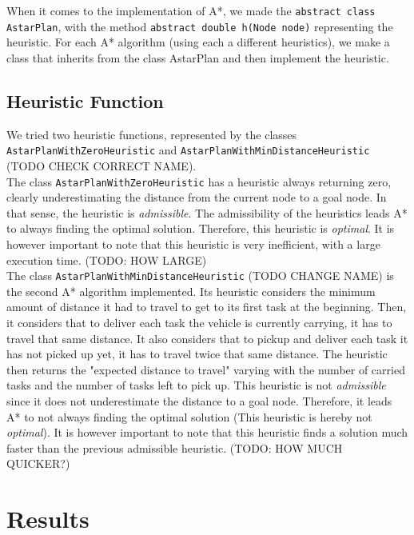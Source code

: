 \documentclass[11pt]{article}
\begin{document}
When it comes to the implementation of A*, we made the \texttt{abstract class AstarPlan}, with the method \texttt{abstract double h(Node node)} representing the heuristic. For each A* algorithm (using each a different heuristics), we make a class that inherits from\textsl{} the class AstarPlan and then implement the heuristic. 

\subsection{Heuristic Function}
We tried two heuristic functions, represented by the classes \texttt{AstarPlanWithZeroHeuristic} and \texttt{AstarPlanWithMinDistanceHeuristic} (TODO CHECK CORRECT NAME).\\

The class \texttt{AstarPlanWithZeroHeuristic} has a heuristic always returning zero, clearly underestimating the distance from the current node to a goal node. In that sense, the heuristic is \textit{admissible}. The admissibility of the heuristics leads A* to always finding the optimal solution. Therefore, this heuristic is \textit{optimal}. It is however important to note that this heuristic is very inefficient, with a large execution time. (TODO: HOW LARGE)\\

The class \texttt{AstarPlanWithMinDistanceHeuristic} (TODO CHANGE NAME) is the second A* algorithm implemented. Its heuristic considers the minimum amount of distance it had to travel to get to its first task at the beginning. Then, it considers that to deliver each task the vehicle is currently carrying, it has to travel that same distance. It also considers that to pickup and deliver each task it has not picked up yet, it has to travel twice that same distance. The heuristic then returns the "expected distance to travel" varying with the number of carried tasks and the number of tasks left to pick up. This heuristic is not \textit{admissible} since it does not underestimate the distance to a goal node. Therefore, it leads A* to not always finding the optimal solution (This heuristic is hereby not \textit{optimal}). It is however important to note that this heuristic finds a solution much faster than the previous admissible heuristic. (TODO: HOW MUCH QUICKER?) 

\section{Results}
\end{document}
